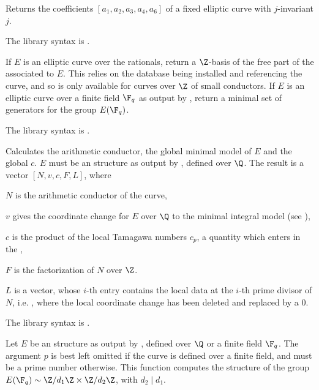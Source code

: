 \label{se:ellfromj}
Returns the coefficients $[a_1,a_2,a_3,a_4,a_6]$ of a fixed elliptic curve
with $j$-invariant $j$.

The library syntax is .

\label{se:ellgenerators}
If $E$ is an elliptic curve over the rationals, return a $\Z$-basis of the
free part of the  associated to $E$.  This relies on
the  database being installed and referencing the curve, and so
is only available for curves over $\Z$ of small conductors.
If $E$ is an elliptic curve over a finite field $\F_q$ as output by
, return a minimal set of generators for the group $E(\F_q)$.

The library syntax is .

\label{se:ellglobalred}
Calculates the arithmetic conductor, the global
minimal model of $E$ and the global  $c$.
$E$ must be an  structure as output by , defined over
$\Q$. The result is a vector $[N,v,c,F,L]$, where

\item $N$ is the arithmetic conductor of the curve,

\item $v$ gives the coordinate change for $E$ over $\Q$ to the minimal
integral model (see ),

\item $c$ is the product of the local Tamagawa numbers $c_p$, a quantity
which enters in the ,

\item $F$ is the factorization of $N$ over $\Z$.

\item $L$ is a vector, whose $i$-th entry contains the local data
at the $i$-th prime divisor of $N$, i.e. ,
where the local coordinate change has been deleted and replaced by a 0.

The library syntax is .

\label{se:ellgroup}
Let $E$ be an  structure as output by , defined over
$\Q$ or a finite field $\F_q$. The argument $p$ is best left omitted if the
curve is defined over a finite field, and must be a prime number otherwise.
This function computes the structure of the group $E(\F_q) \sim \Z/d_1\Z
\times \Z/d_2\Z$, with $d_2\mid d_1$.

